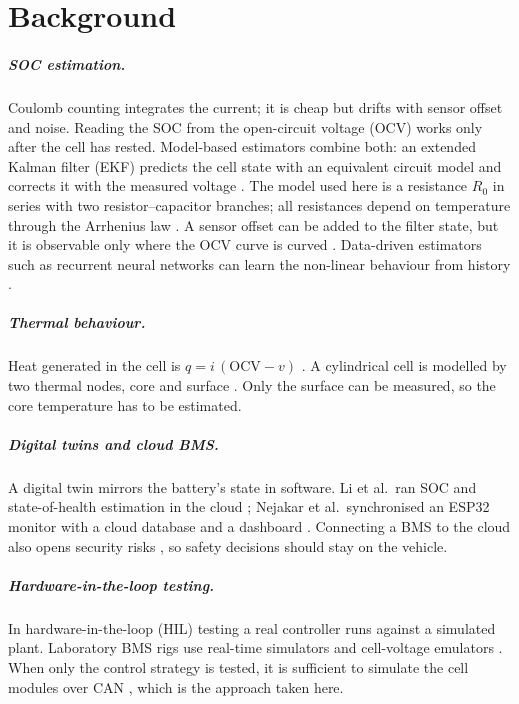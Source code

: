 \chapter{Background}\label{ch:background}

\paragraph{SOC estimation.} Coulomb counting integrates the current; it is cheap but drifts with sensor offset and noise. Reading the SOC from the open-circuit voltage (OCV) works only after the cell has rested. Model-based estimators combine both: an extended Kalman filter (EKF) predicts the cell state with an equivalent circuit model and corrects it with the measured voltage \citep{plett2004ekf}. The model used here is a resistance $R_0$ in series with two resistor--capacitor branches; all resistances depend on temperature through the Arrhenius law \citep{plett2015}. A sensor offset can be added to the filter state, but it is observable only where the OCV curve is curved \citep{zhao2017}. Data-driven estimators such as recurrent neural networks can learn the non-linear behaviour from history \citep{nejakar2025}.

\paragraph{Thermal behaviour.} Heat generated in the cell is $q = i\,(\mathrm{OCV} - v)$ \citep{bernardi1985}. A cylindrical cell is modelled by two thermal nodes, core and surface \citep{lin2014}. Only the surface can be measured, so the core temperature has to be estimated.

\paragraph{Digital twins and cloud BMS.} A digital twin mirrors the battery's state in software. Li et al.\ ran SOC and state-of-health estimation in the cloud \citep{li2020}; Nejakar et al.\ synchronised an ESP32 monitor with a cloud database and a dashboard \citep{nejakar2025}. Connecting a BMS to the cloud also opens security risks \citep{naseri2023}, so safety decisions should stay on the vehicle.

\paragraph{Hardware-in-the-loop testing.} In hardware-in-the-loop (HIL) testing a real controller runs against a simulated plant. Laboratory BMS rigs use real-time simulators and cell-voltage emulators \citep{barreras2016,bui2019}. When only the control strategy is tested, it is sufficient to simulate the cell modules over CAN \citep{haupt2013}, which is the approach taken here.
